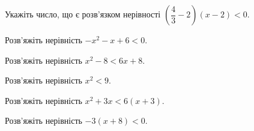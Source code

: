 \documentclass[12pt]{article}
\begin{document}
\begin{samepage}
\noindent\zadnum Укажіть число, що є розв'язком нерівності $\left(\dfrac{4}{3} - 2\right)(x - 2) < 0$. 
\par{}
\end{samepage}

\begin{samepage}
\noindent\zadnum Розв'яжіть нерівність $-x^2 - x + 6 < 0$. 
\par{}\vspace{0.25cm}
\end{samepage}

\begin{samepage}
\noindent\zadnum Розв'яжіть нерівність $x^2 - 8 < 6x + 8$. 
\par{}\vspace{0.25cm}
\end{samepage}

\begin{samepage}
\noindent\zadnum Розв'яжіть нерівність $x^2 < 9$. 
\par{}\vspace{0.25cm}
\end{samepage}

\begin{samepage}
\noindent\zadnum Розв'яжіть нерівність $x^2 + 3x < 6(x + 3)$. 
\par{}\vspace{0.25cm}
\end{samepage}

\begin{samepage}
\noindent\zadnum Розв'яжіть нерівність $-3(x + 8) < 0$. 
\par{}
\end{samepage}
\end{document}
